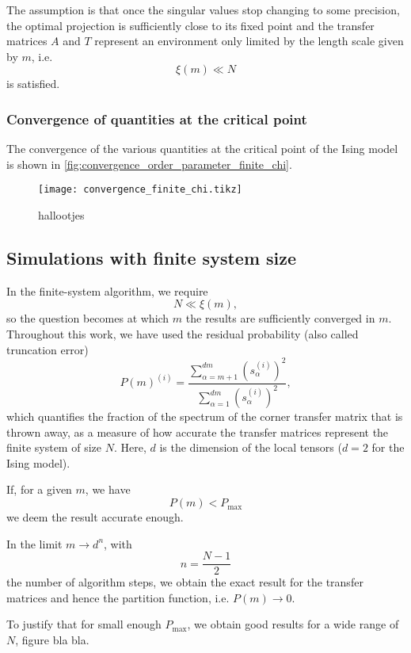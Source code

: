 The assumption is that once the singular values stop changing to some precision, the optimal projection is sufficiently
close to its fixed point and the transfer matrices $A$ and $T$ represent an environment only limited by the length scale
given by $m$, i.e.
\begin{equation}
  \xi(m) \ll N
\end{equation}
is satisfied.

\subsubsection{Convergence of quantities at the critical point}
The convergence of the various quantities at the critical point of the Ising model is shown in
\autoref{fig:convergence_order_parameter_finite_chi}.


\begin{figure}
  \texttt{[image: convergence\_finite\_chi.tikz]}
  \caption{hallootjes}\label{fig:convergence_order_parameter_finite_chi}
\end{figure}


\subsection{Simulations with finite system size}
In the finite-system algorithm, we require
\begin{equation}
  N \ll \xi(m),
\end{equation}
so the question becomes at which $m$ the results are sufficiently converged in $m$. Throughout this work, we have used
the residual probability (also called truncation error)
\begin{equation}
  P(m)^{(i)} = \frac{\sum_{\alpha = m + 1}^{dm} (s_{\alpha}^{(i)})^2 }{ \sum_{\alpha = 1}^{dm} (s_{\alpha}^{(i)})^2 },
\end{equation}
which quantifies the fraction of the spectrum of the corner transfer matrix that is thrown away, as a measure of how
accurate the transfer matrices represent the finite system of size $N$. Here, $d$ is the
dimension of the local tensors ($d = 2$ for the Ising model).

If, for a given $m$, we have
\begin{equation}
  P(m) < P_{\text{max}}
\end{equation}
we deem the result accurate enough.

In the limit $m \to d^n$, with
\begin{equation}
  n = \frac{N - 1}{2}
\end{equation}
the number of algorithm steps, we obtain the exact result for the transfer matrices and hence the partition function,
i.e. $P(m) \to 0$.

To justify that for small enough $P_{\max}$, we obtain good results for a wide range of $N$, figure bla bla.
